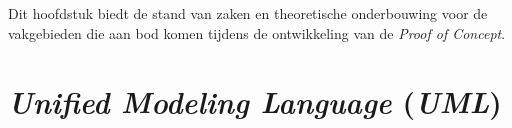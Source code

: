 





Dit hoofdstuk biedt de stand van zaken en theoretische onderbouwing voor de vakgebieden die aan bod komen tijdens de ontwikkeling van de \emph{Proof of Concept}.

\section{\emph{Unified Modeling Language} (\emph{UML})}%
\label{sec:uml}

